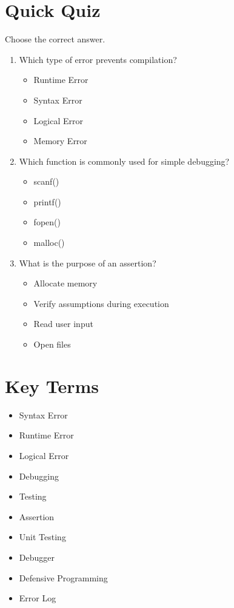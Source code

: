\documentclass[12pt,openany]{book}
\begin{document}
\section{Quick Quiz}

Choose the correct answer.

\begin{enumerate}
    \item Which type of error prevents compilation?
    \begin{itemize}
        \item Runtime Error
        \item Syntax Error
        \item Logical Error
        \item Memory Error
    \end{itemize}

    \item Which function is commonly used for simple debugging?
    \begin{itemize}
        \item scanf()
        \item printf()
        \item fopen()
        \item malloc()
    \end{itemize}

    \item What is the purpose of an assertion?
    \begin{itemize}
        \item Allocate memory
        \item Verify assumptions during execution
        \item Read user input
        \item Open files
    \end{itemize}
\end{enumerate}

\section{Key Terms}

\begin{itemize}
    \item Syntax Error
    \item Runtime Error
    \item Logical Error
    \item Debugging
    \item Testing
    \item Assertion
    \item Unit Testing
    \item Debugger
    \item Defensive Programming
    \item Error Log
\end{itemize}
\end{document}
